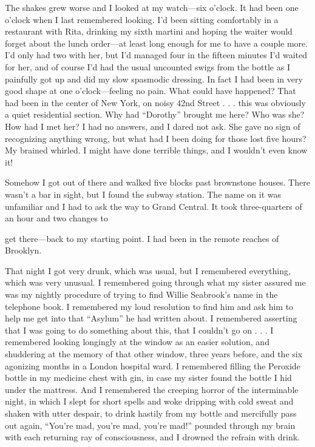 \begin{biblechapter}
The shakes grew worse and I looked at my watch—six o’clock. It had been one o’clock when I last remembered looking. I’d been sitting comfortably in a restaurant with Rita, drinking my sixth martini and hoping the waiter would forget about the lunch order—at least long enough for me to have a couple more. I’d only had two with her, but I’d managed four in the fifteen minutes I’d waited for her, and of course I’d had the usual uncounted swigs from the bottle as I painfully got up and did my slow spasmodic dressing. In fact I had been in very good shape at one o’clock—feeling no pain. What could have happened? That had been in the center of New York, on noisy 42nd Street . . . this was obviously a quiet residential section. Why had “Dorothy” brought me here? Who was she? How had I met her? I had no answers, and I dared not ask. She gave no sign of recognizing anything wrong, but what had I been doing for those lost five hours? My brained whirled. I might have done terrible things, and I wouldn’t even know it!

Somehow I got out of there and walked five blocks past brownstone houses. There wasn’t a bar in sight, but I found the subway station. The name on it was unfamiliar and I had to ask the way to Grand Central. It took three-quarters of an hour and two changes to

get there—back to my starting point. I had been in the remote reaches of Brooklyn.

That night I got very drunk, which was usual, but I remembered everything, which was very unusual. I remembered going through what my sister assured me was my nightly procedure of trying to find Willie Seabrook’s name in the telephone book. I remembered my loud resolution to find him and ask him to help me get into that “Asylum” he had written about. I remembered asserting that I was going to do something about this, that I couldn’t go on . . . I remembered looking longingly at the window as an easier solution, and shuddering at the memory of that other window, three years before, and the six agonizing months in a London hospital ward. I remembered filling the Peroxide bottle in my medicine chest with gin, in case my sister found the bottle I hid under the mattress. And I remembered the creeping horror of the interminable night, in which I slept for short spells and woke dripping with cold sweat and shaken with utter despair, to drink hastily from my bottle and mercifully pass out again, “You’re mad, you’re mad, you’re mad!” pounded through my brain with each returning ray of consciousness, and I drowned the refrain with drink.


\end{biblechapter}

